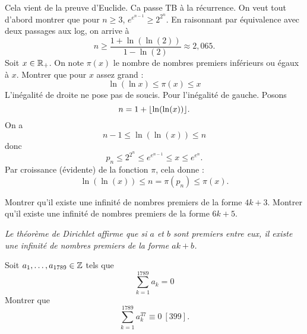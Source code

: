\documentclass{magnolia}
\begin{document}
\begin{sol}
\begin{questions}
\question  Cela vient de la preuve d'Euclide.
\question  Ca passe TB à la récurrence.
\question  On veut tout d'abord montrer que pour $n\geq3$, $e^{e^{n-1}} \geq 2^{2^n}$. En raisonnant par équivalence avec deux passages aux log, on arrive à $$n\geq \dfrac{1+\ln(\ln(2))}{1-\ln(2)}\approx 2,065.$$
Soit $x\in\mathbb{R}_+$. On note $\pi(x)$ le nombre de nombres premiers inférieurs ou égaux à $x$. Montrer que pour $x$ assez grand :
  \[\ln(\ln x) \leq \pi(x) \leq x\]
  L'inégalité de droite ne pose pas de soucis.
  Pour l'inégalité de gauche. Posons $$n=1+\ent{\ln(\ln(x))}.$$
  On a $$n-1\leq \ln(\ln(x))\leq n$$ donc $$p_n\leq 2^{2^n}\leq e^{e^{n-1}}\leq x \leq e^{e^n}.$$ Par croissance (évidente) de la fonction $\pi$, cela donne :
  $$\ln(\ln(x))\leq n=\pi(p_n)\leq \pi(x).$$
\end{questions}
\end{sol}

\begin{questions}
\question Montrer qu'il existe une infinité de nombres premiers de la forme
  $4k+3$.
\question Montrer qu'il existe une infinité de nombres premiers de la forme
  $6k+5$.
\end{questions}
{\it Le théorème de {\sc Dirichlet} affirme que si $a$ et $b$ sont premiers entre eux, il existe une infinité de nombres premiers de la forme $ak+b$.}


Soit $a_1,\ldots,a_{1789}\in\mathbb{Z}$ tels que
\[\sum_{k=1}^{1789} a_k=0\]
Montrer que
\[\sum_{k=1}^{1789} a_k^{37} \equiv 0\ [399].\]
























\end{document}
